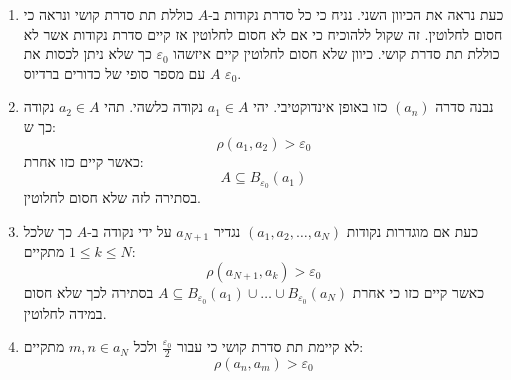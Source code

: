\documentclass{tstextbook}
\begin{document}
\begin{enumerate}
  \item כעת נראה את הכיוון השני. נניח כי כל סדרת נקודות ב-\(A\) כוללת תת סדרת קושי ונראה כי חסום לחלוטין. זה שקול ללהוכיח כי אם לא חסום לחלוטין אז קיים סדרת נקודות אשר לא כוללת תת סדרת קושי. כיוון שלא חסום לחלוטין קיים איזשהו \(\varepsilon_{0}\) כך שלא ניתן לכסות את \(A\) עם מספר סופי של כדורים ברדיוס \(\varepsilon_{0}\). 


  \item נבנה סדרה \((a_{n})\) כזו באופן אינדוקטיבי. יהי \(a_{1} \in A\) נקודה כלשהי. תהי \(a_{2} \in A\) נקודה כך ש: 
$$\rho(a_{1},a_{2})>\varepsilon_{0}$$
כאשר קיים כזו אחרת:
$$A\subseteq B_{\varepsilon_{0}}(a_{1})$$
בסתירה לזה שלא חסום לחלוטין.


  \item כעת אם מוגדרות נקודות \((a_{1},a_{2},\dots,a_{N})\) נגדיר \(a_{N+1}\) על ידי נקודה ב-\(A\) כך שלכל \(1\leq k\leq N\) מתקיים: 
$$\rho(a_{N+1},a_{k})> \varepsilon_{0}$$
כאשר קיים כזו כי אחרת \(A\subseteq{ B_{\varepsilon_{0}}(a_{1}) }\cup \dots \cup {  B_{\varepsilon_{0}}(a_{N}) }\) בסתירה לכך שלא חסום במידה לחלוטין.


  \item לא קיימת תת סדרת קושי כי עבור \(\frac{\varepsilon_{0}}{2}\) ולכל \(m,n \in a_{N}\) מתקיים: 
$$\rho(a_{n},a_{m})>\varepsilon_{0}$$


\end{enumerate}
\end{document}
